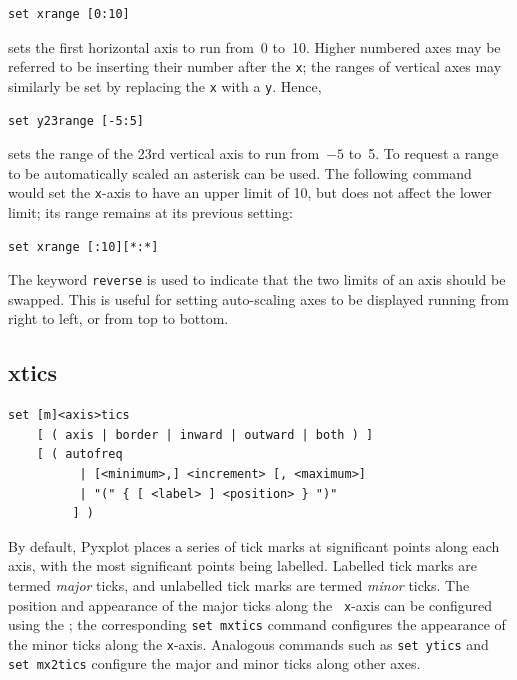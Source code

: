\begin{verbatim}
set xrange [0:10]
\end{verbatim}

\noindent sets the first horizontal axis to run from~0 to~10.  Higher numbered
axes may be referred to be inserting their number after the {\tt x}; the ranges
of vertical axes may similarly be set by replacing the {\tt x} with a {\tt y}.
Hence,

\begin{verbatim}
set y23range [-5:5]
\end{verbatim}

\noindent sets the range of the 23rd vertical axis to run from~$-5$ to~5.  To
request a range to be automatically scaled an asterisk can be used.  The
following command would set the {\tt x}-axis to have an upper limit of 10, but
does not affect the lower limit; its range remains at its previous setting:

\begin{verbatim}
set xrange [:10][*:*]
\end{verbatim}

The keyword {\tt reverse} is used to indicate that the two limits of an axis
should be swapped. This is useful for setting auto-scaling axes to be displayed
running from right to left, or from top to bottom.


\subsection{xtics}

\begin{verbatim}
set [m]<axis>tics
    [ ( axis | border | inward | outward | both ) ]
    [ ( autofreq
          | [<minimum>,] <increment> [, <maximum>]
          | "(" { [ <label> ] <position> } ")"
         ] )
\end{verbatim}

By default, Pyxplot places a series of tick marks at significant points along
each axis, with the most significant points being labelled.  Labelled tick
marks are termed {\it major} ticks, and unlabelled tick marks are termed {\it
minor} ticks.  The position and appearance of the major ticks along the {\tt
x}-axis can be configured using the ; the corresponding
{\tt set mxtics} command configures the appearance of the minor ticks along the
{\tt x}-axis. Analogous commands such as {\tt set ytics} and {\tt set mx2tics}
configure the major and minor ticks along other axes.

